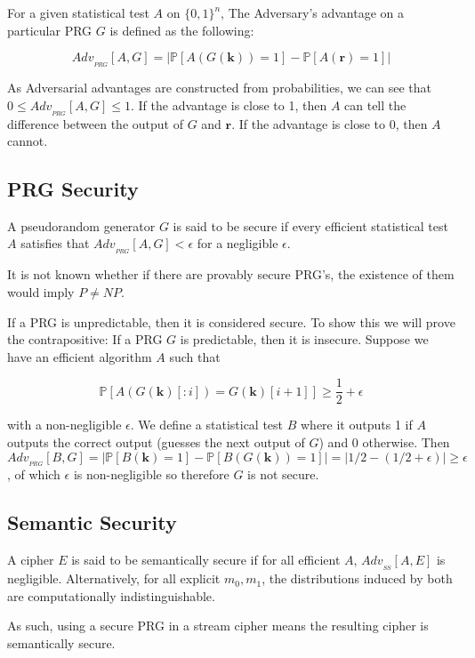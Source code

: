 \documentclass{article}
\begin{document}
\begin{multicols}{2}
For a given statistical test $A$ on $\{0,1\}^n$, The Adversary's advantage on a particular PRG $G$ is defined as the following:

$$
Adv_{_{PRG}}[A, G] = | \mathbb{P}[A(G(\mathbf{k})) = 1] - \mathbb{P}[A(\mathbf{r}) = 1] |
$$

As Adversarial advantages are constructed from probabilities, we can see that $0 \leq Adv_{_{PRG}}[A, G] \leq 1$. If the advantage is close to 1, then $A$ can tell the difference between the output of $G$ and $\mathbf{r}$. If the advantage is close to 0, then $A$ cannot. 

\subsection {PRG Security}

A pseudorandom generator $G$ is said to be secure if every efficient statistical test $A$ satisfies that $Adv_{_{PRG}}[A, G] < \epsilon$ for a negligible $\epsilon$.

It is not known whether if there are provably secure PRG's, the existence of them would imply $P \neq NP$.

If a PRG is unpredictable, then it is considered secure. To show this we will prove the contrapositive: If a PRG $G$ is predictable, then it is insecure. Suppose we have an efficient algorithm $A$ such that 

$$
\mathbb{P}[A(G(\mathbf{k})[:i]) = G(\mathbf{k})[i+1]] \geq \frac{1}{2} + \epsilon
$$

with a non-negligible $\epsilon$. We define a statistical test $B$ where it outputs 1 if $A$ outputs the correct output (guesses the next output of $G$) and 0 otherwise. Then $Adv_{_{PRG}}[B,G] = |\mathbb{P}[B(\mathbf{k}) = 1] - \mathbb{P}[B(G(\mathbf{k})) = 1]| = | 1/2 - (1/2 + \epsilon)| \geq \epsilon$, of which $\epsilon$ is non-negligible so therefore $G$ is not secure.

\subsection {Semantic Security}

A cipher $E$ is said to be semantically secure if for all efficient $A$, $Adv_{_{SS}}[A,E]$ is negligible. Alternatively, for all explicit $m_0, m_1$, the distributions induced by both are computationally indistinguishable.

As such, using a secure PRG in a stream cipher means the resulting cipher is semantically secure.


\end{multicols}
\end{document}
